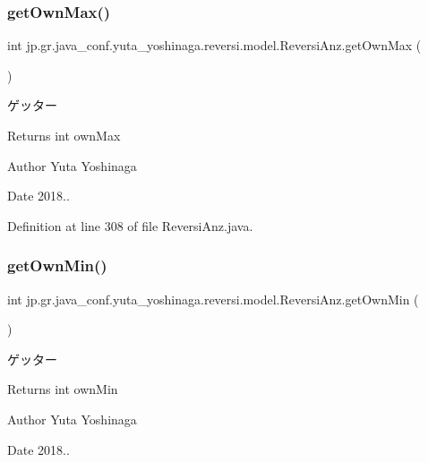 \subsubsection{\texorpdfstring{get\+Own\+Max()}{getOwnMax()}}
{\footnotesize\ttfamily int jp.\+gr.\+java\+\_\+conf.\+yuta\+\_\+yoshinaga.\+reversi.\+model.\+Reversi\+Anz.\+get\+Own\+Max (\begin{DoxyParamCaption}{ }\end{DoxyParamCaption})}



ゲッター 

\begin{DoxyReturn}{Returns}
int own\+Max 
\end{DoxyReturn}
\begin{DoxyAuthor}{Author}
Yuta Yoshinaga 
\end{DoxyAuthor}
\begin{DoxyDate}{Date}
2018.. 
\end{DoxyDate}


Definition at line 308 of file Reversi\+Anz.\+java.

\mbox{\label{classjp_1_1gr_1_1java__conf_1_1yuta__yoshinaga_1_1reversi_1_1model_1_1_reversi_anz_a680562962d38f2056d67402b39b428f7}} 
\subsubsection{\texorpdfstring{get\+Own\+Min()}{getOwnMin()}}
{\footnotesize\ttfamily int jp.\+gr.\+java\+\_\+conf.\+yuta\+\_\+yoshinaga.\+reversi.\+model.\+Reversi\+Anz.\+get\+Own\+Min (\begin{DoxyParamCaption}{ }\end{DoxyParamCaption})}



ゲッター 

\begin{DoxyReturn}{Returns}
int own\+Min 
\end{DoxyReturn}
\begin{DoxyAuthor}{Author}
Yuta Yoshinaga 
\end{DoxyAuthor}
\begin{DoxyDate}{Date}
2018.. 
\end{DoxyDate}


